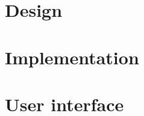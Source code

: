 \section{Design\label{sec:design}}


\section{Implementation\label{sec:implementation}}


\section{User interface\label{sec:user-interface}}
